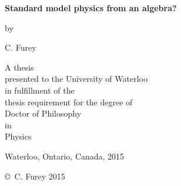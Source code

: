 \pagestyle{empty}




\begin{titlepage}
        \begin{center}
        \vspace*{1.0cm}




        \Huge
        {\bf  Standard model physics from an algebra? }

        \vspace*{1.0cm}

        \normalsize
        by \\

        \vspace*{1.0cm}

        \Large
        C. Furey \\

        \vspace*{3.0cm}

        \normalsize
        A thesis \\
        presented to the University of Waterloo \\ 
        in fulfillment of the \\
        thesis requirement for the degree of \\
        Doctor of Philosophy \\
        in \\
        Physics \\

        \vspace*{2.0cm}

        Waterloo, Ontario, Canada, 2015 \\

        \vspace*{1.0cm}

        \copyright\ C. Furey 2015 \\
        \end{center}
\end{titlepage}

\pagestyle{plain}
\setcounter{page}{2}

